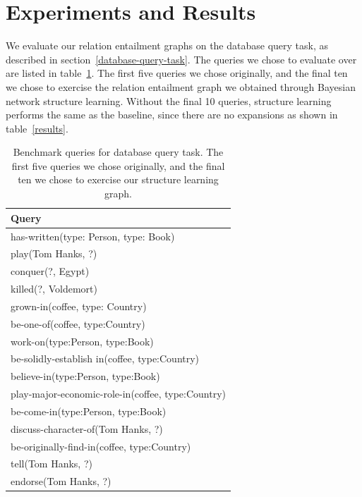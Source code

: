 \documentclass{article}
\begin{document}


\section{Experiments and Results}
We evaluate our relation entailment graphs on the database query task, as described in section~\ref{database-query-task}. The queries we chose to evaluate over are listed in table~\ref{benchmark-queries}. The first five queries we chose originally, and the final ten we chose to exercise the relation entailment graph we obtained through Bayesian network structure learning. Without the final 10 queries, structure learning performs the same as the baseline, since there are no expansions as shown in table~\ref{results}.

\begin{table}[h]
  \caption{Benchmark queries for database query task. The first five queries we chose originally, and the final ten we chose to exercise our structure learning graph. }\label{benchmark-queries} 
  \begin{center}
    \sffamily 
    \begin{tabular}{l}
      \toprule
      \textrm{Query}\\
      \midrule
      has-written(type: Person, type: Book)\\
      play(Tom Hanks, ?)\\
      conquer(?, Egypt)\\
      killed(?, Voldemort)\\
      grown-in(coffee, type: Country)\\
      \midrule
      be-one-of(coffee, type:Country)\\
      work-on(type:Person, type:Book)\\
      be-solidly-establish in(coffee, type:Country)\\
      believe-in(type:Person, type:Book)\\
      play-major-economic-role-in(coffee, type:Country)\\
      be-come-in(type:Person, type:Book)\\
      discuss-character-of(Tom Hanks, ?)\\
      be-originally-find-in(coffee, type:Country)\\
      tell(Tom Hanks, ?)\\
      endorse(Tom Hanks, ?)\\
      \bottomrule
    \end{tabular}
  \end{center}
\end{table}
\end{document}
